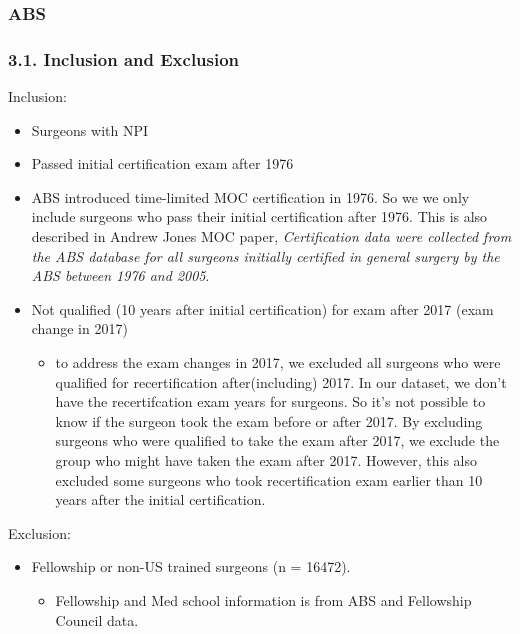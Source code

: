 \documentclass[
]{article}
\providecommand{\tightlist}{%
  \setlength{\itemsep}{0pt}\setlength{\parskip}{0pt}}
\begin{document}
\hypertarget{abs}{%
\subsubsection{ABS}\label{abs}}

\hypertarget{inclusion-and-exclusion}{%
\subsubsection{3.1. Inclusion and
Exclusion}\label{inclusion-and-exclusion}}

Inclusion:

\begin{itemize}
\tightlist
\item
  Surgeons with NPI
\item
  Passed initial certification exam after 1976
\item
  ABS introduced time-limited MOC certification in 1976. So we we only
  include surgeons who pass their initial certification after 1976. This
  is also described in Andrew Jones MOC paper, \emph{Certification data
  were collected from the ABS database for all surgeons initially
  certified in general surgery by the ABS between 1976 and 2005}.
\item
  Not qualified (10 years after initial certification) for exam after
  2017 (exam change in 2017)

  \begin{itemize}
  \tightlist
  \item
    to address the exam changes in 2017, we excluded all surgeons who
    were qualified for recertification after(including) 2017. In our
    dataset, we don't have the recertifcation exam years for surgeons.
    So it's not possible to know if the surgeon took the exam before or
    after 2017. By excluding surgeons who were qualified to take the
    exam after 2017, we exclude the group who might have taken the exam
    after 2017. However, this also excluded some surgeons who took
    recertification exam earlier than 10 years after the initial
    certification.
  \end{itemize}
\end{itemize}

Exclusion:

\begin{itemize}
\tightlist
\item
  Fellowship or non-US trained surgeons (n = 16472).

  \begin{itemize}
  \tightlist
  \item
    Fellowship and Med school information is from ABS and Fellowship
    Council data.
  \end{itemize}
\end{itemize}
\end{document}
